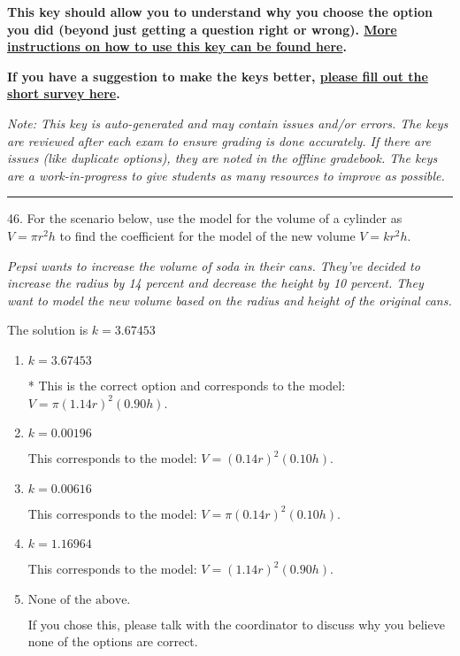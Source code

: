 \documentclass{article}[14pt]
\begin{document}
\textbf{This key should allow you to understand why you choose the option you did (beyond just getting a question right or wrong). \href{https://xronos.clas.ufl.edu/mac1105spring2020/courseDescriptionAndMisc/Exams/LearningFromResults}{More instructions on how to use this key can be found here}.}

\textbf{If you have a suggestion to make the keys better, \href{https://forms.gle/CZkbZmPbC9XALEE88}{please fill out the short survey here}.}

\textit{Note: This key is auto-generated and may contain issues and/or errors. The keys are reviewed after each exam to ensure grading is done accurately. If there are issues (like duplicate options), they are noted in the offline gradebook. The keys are a work-in-progress to give students as many resources to improve as possible.}

\rule{\textwidth}{0.4pt}

46. For the scenario below, use the model for the volume of a cylinder as $V = \pi r^2 h$ to find the coefficient for the model of the new volume $V = k r^2 h$.
\begin{center} \textit{Pepsi wants to increase the volume of soda in their cans. They've decided to increase the radius by 14 percent and decrease the height by 10 percent. They want to model the new volume based on the radius and height of the original cans.} \end{center} 
The solution is $ k = 3.67453 $ 

\begin{enumerate}[label=\Alph*.] 
\item $ k = 3.67453 $ 

 * This is the correct option and corresponds to the model: $V = \pi (1.14 r)^2 (0.90 h)$. 
\item $ k = 0.00196 $ 

 This corresponds to the model: $V = (0.14 r)^2 (0.10 h)$. 
\item $ k = 0.00616 $ 

 This corresponds to the model: $V = \pi (0.14 r)^2 (0.10 h)$. 
\item $ k = 1.16964 $ 

 This corresponds to the model: $V = (1.14 r)^2 (0.90 h)$. 
\item $ \text{None of the above.} $ 

 If you chose this, please talk with the coordinator to discuss why you believe none of the options are correct. 
\end{enumerate} 
 
\end{document}
